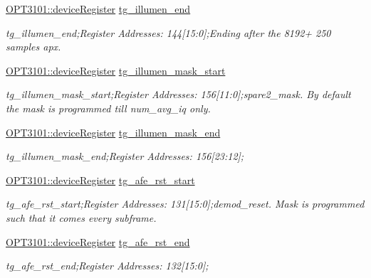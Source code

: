 \begin{DoxyCompactItemize}
\mbox{\hyperlink{class_o_p_t3101_1_1device_register}{O\+P\+T3101\+::device\+Register}} \mbox{\hyperlink{class_o_p_t3101_1_1registers_a70082ca9b2affbe66ae355c3f66df5cb}{tg\+\_\+illumen\+\_\+end}}
\begin{DoxyCompactList}\small\item\em tg\+\_\+illumen\+\_\+end;Register Addresses\+: 144\mbox{[}15\+:0\mbox{]};Ending after the 8192+ 250 samples apx. \end{DoxyCompactList}\item 
\mbox{\hyperlink{class_o_p_t3101_1_1device_register}{O\+P\+T3101\+::device\+Register}} \mbox{\hyperlink{class_o_p_t3101_1_1registers_a5cf64985550cfe24cc722d40ab011be5}{tg\+\_\+illumen\+\_\+mask\+\_\+start}}
\begin{DoxyCompactList}\small\item\em tg\+\_\+illumen\+\_\+mask\+\_\+start;Register Addresses\+: 156\mbox{[}11\+:0\mbox{]};spare2\+\_\+mask. By default the mask is programmed till num\+\_\+avg\+\_\+iq only. \end{DoxyCompactList}\item 
\mbox{\hyperlink{class_o_p_t3101_1_1device_register}{O\+P\+T3101\+::device\+Register}} \mbox{\hyperlink{class_o_p_t3101_1_1registers_af45af1b39e7f8d73bece88e66f68de06}{tg\+\_\+illumen\+\_\+mask\+\_\+end}}
\begin{DoxyCompactList}\small\item\em tg\+\_\+illumen\+\_\+mask\+\_\+end;Register Addresses\+: 156\mbox{[}23\+:12\mbox{]}; \end{DoxyCompactList}\item 
\mbox{\hyperlink{class_o_p_t3101_1_1device_register}{O\+P\+T3101\+::device\+Register}} \mbox{\hyperlink{class_o_p_t3101_1_1registers_abe9a28eaeb59586d08377edb39dde6a8}{tg\+\_\+afe\+\_\+rst\+\_\+start}}
\begin{DoxyCompactList}\small\item\em tg\+\_\+afe\+\_\+rst\+\_\+start;Register Addresses\+: 131\mbox{[}15\+:0\mbox{]};demod\+\_\+reset. Mask is programmed such that it comes every subframe. \end{DoxyCompactList}\item 
\mbox{\hyperlink{class_o_p_t3101_1_1device_register}{O\+P\+T3101\+::device\+Register}} \mbox{\hyperlink{class_o_p_t3101_1_1registers_abc508beaa4d4a7284b224406c1c97dee}{tg\+\_\+afe\+\_\+rst\+\_\+end}}
\begin{DoxyCompactList}\small\item\em tg\+\_\+afe\+\_\+rst\+\_\+end;Register Addresses\+: 132\mbox{[}15\+:0\mbox{]}; \end{DoxyCompactList}\item 

\end{DoxyCompactItemize}
